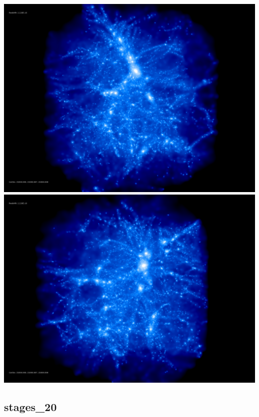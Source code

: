 \includegraphics[scale=0.1]{stages_19/rotate_00074.jpg} 
\includegraphics[scale=0.1]{stages_19/rotate_00131.jpg}


% 
%
%
%
%
%
%
%

\newpage
\subsection{stages\_20}

